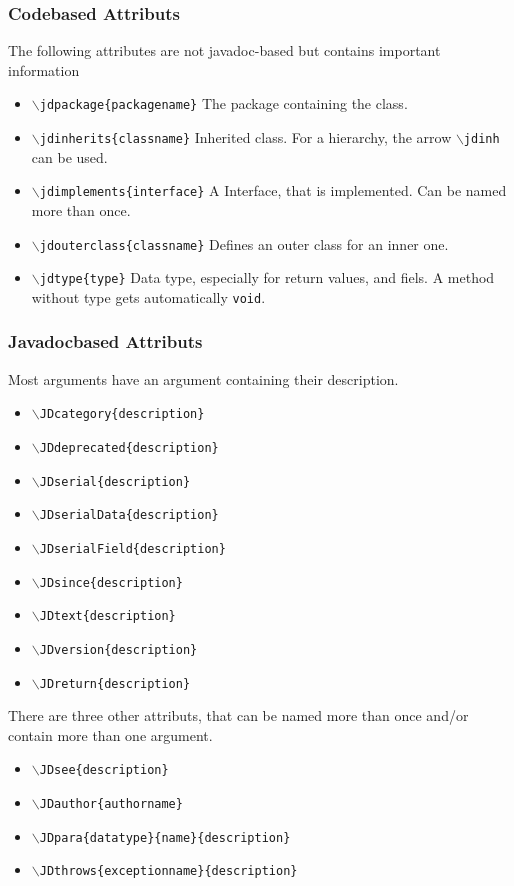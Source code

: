 \documentclass[11pt,a4paper]{article}
\newcommand{\code}[1]{\protect\texttt{#1}}
\newcommand{\befehl}[1]{\code{$\backslash$#1}}
\begin{document}
\subsubsection{Codebased Attributs}
The following attributes are not javadoc-based but contains important information

\begin{itemize}
	\item \befehl{jdpackage\{packagename\}} The package containing the class.
	\item \befehl{jdinherits\{classname\}} Inherited class. For a hierarchy, the arrow \befehl{jdinh} can be used.
	\item \befehl{jdimplements\{interface\}} A Interface, that is implemented. Can be named more than once.
	\item \befehl{jdouterclass\{classname\}} Defines an outer class for an inner one.
	\item \befehl{jdtype\{type\}} Data type, especially for return values, and fiels. A method without type gets automatically \code{void}.
\end{itemize}

\subsubsection{Javadocbased Attributs}
Most arguments have an argument containing their description.

\begin{itemize}
	\item \befehl{JDcategory\{description\}}
	\item \befehl{JDdeprecated\{description\}}
	\item \befehl{JDserial\{description\}}
	\item \befehl{JDserialData\{description\}}
	\item \befehl{JDserialField\{description\}}
	\item \befehl{JDsince\{description\}}
	\item \befehl{JDtext\{description\}}
	\item \befehl{JDversion\{description\}}
	\item \befehl{JDreturn\{description\}}
\end{itemize}

There are three other attributs, that can be named more than once and/or contain more than one argument.
\begin{itemize}
	\item \befehl{JDsee\{description\}}
	\item \befehl{JDauthor\{authorname\}}
	\item \befehl{JDpara\{datatype\}\{name\}\{description\}}
	\item \befehl{JDthrows\{exceptionname\}\{description\}}
\end{itemize}
\end{document}
